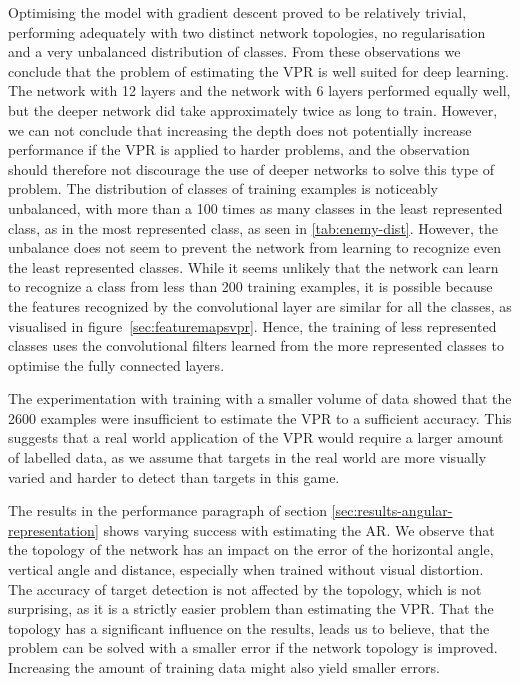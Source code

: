 Optimising the model with gradient descent proved to be relatively trivial, performing adequately with two distinct network topologies, no regularisation and a very unbalanced distribution of classes. From these observations we conclude that the problem of estimating the VPR is well suited for deep learning. The network with 12 layers and the network with 6 layers performed equally well, but the deeper network did take approximately twice as long to train. However, we can not conclude that increasing the depth does not potentially increase performance if the VPR is applied to harder problems, and the observation should therefore not discourage the use of deeper networks to solve this type of problem. The distribution of classes of training examples is noticeably unbalanced, with more than a 100 times as many classes in the least represented class, as in the most represented class, as seen in \ref{tab:enemy-dist}. However, the unbalance does not seem to prevent the network from learning to recognize even the least represented classes. While it seems unlikely that the network can learn to recognize a class from less than 200 training examples, it is possible because the features recognized by the convolutional layer are similar for all the classes, as visualised in figure~\ref{sec:featuremapsvpr}. Hence, the training of less represented classes uses the convolutional filters learned from the more represented classes to optimise the fully connected layers.

The experimentation with training with a smaller volume of data showed that the 2600 examples were insufficient to estimate the VPR to a sufficient accuracy. This suggests that a real world application of the VPR would require a larger amount of labelled data, as we assume that targets in the real world are more visually varied and harder to detect than targets in this game.

The results in the performance paragraph of section \ref{sec:results-angular-representation} shows varying success with estimating the AR. We observe that the topology of the network has an impact on the error of the horizontal angle, vertical angle and distance, especially when trained without visual distortion. The accuracy of target detection is not affected by the topology, which is not surprising, as it is a strictly easier problem than estimating the VPR. That the topology has a significant influence on the results, leads us to believe, that the problem can be solved with a smaller error if the network topology is improved. Increasing the amount of training data might also yield smaller errors.

